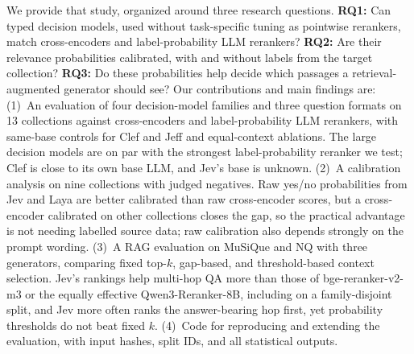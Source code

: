 We provide that study, organized around three research questions.
\textbf{RQ1:} Can typed decision models, used without task-specific tuning as pointwise rerankers, match cross-encoders and label-probability LLM rerankers?
\textbf{RQ2:} Are their relevance probabilities calibrated, with and without labels from the target collection?
\textbf{RQ3:} Do these probabilities help decide which passages a retrieval-augmented generator should see?
Our contributions and main findings are:
(1)~An evaluation of four decision-model families and three question formats on 13 collections against cross-encoders and label-probability LLM rerankers, with same-base controls for Clef and Jeff and equal-context ablations. The large decision models are on par with the strongest label-probability reranker we test; Clef is close to its own base LLM, and Jev's base is unknown.
(2)~A calibration analysis on nine collections with judged negatives. Raw yes/no probabilities from Jev and Laya are better calibrated than raw cross-encoder scores, but a cross-encoder calibrated on other collections closes the gap, so the practical advantage is not needing labelled source data; raw calibration also depends strongly on the prompt wording.
(3)~A RAG evaluation on MuSiQue and NQ with three generators, comparing fixed top-$k$, gap-based, and threshold-based context selection. Jev's rankings help multi-hop QA more than those of bge-reranker-v2-m3 or the equally effective Qwen3-Reranker-8B, including on a family-disjoint split, and Jev more often ranks the answer-bearing hop first, yet probability thresholds do not beat fixed $k$.
(4)~Code for reproducing and extending the evaluation, with input hashes, split IDs, and all statistical outputs.
